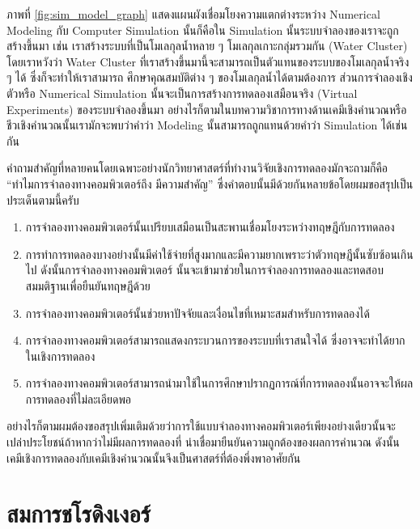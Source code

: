 ภาพที่ \ref{fig:sim_model_graph} แสดงแผนผังเชื่อมโยงความแตกต่างระหว่าง Numerical Modeling กับ Computer Simulation
นั้นก็คือใน Simulation นั้นระบบจำลองของเราจะถูกสร้างขึ้นมา เช่น เราสร้างระบบที่เป็นโมเลกุลน้ำหลาย ๆ โมเลกุลเกาะกลุ่มรวมกัน (Water
Cluster) โดยเราหวังว่า Water Cluster ที่เราสร้างขึ้นมานี้จะสามารถเป็นตัวแทนของระบบของโมเลกุลน้ำจริง ๆ ได้ ซึ่งก็จะทำให้เราสามารถ%
ศึกษาคุณสมบัติต่าง ๆ ของโมเลกุลน้ำได้ตามต้องการ ส่วนการจำลองเชิงตัวหรือ Numerical Simulation นั้นจะเป็นการสร้างการทดลองเสมือนจริง
(Virtual Experiments) ของระบบจำลองขึ้นมา อย่างไรก็ตามในบทความวิชาการทางด้านเคมีเชิงคำนวณหรือชีวเชิงคำนวณนั้นเรามักจะพบว่าคำว่า
Modeling นั้นสามารถถูกแทนด้วยคำว่า Simulation ได้เช่นกัน

คำถามสำคัญที่หลายคนโดยเฉพาะอย่างนักวิทยาศาสตร์ที่ทำงานวิจัยเชิงการทดลองมักจะถามก็คือ \enquote{ทำไมการจำลองทางคอมพิวเตอร์ถึง%
    มีความสำคัญ} ซึ่งคำตอบนั้นมีด้วยกันหลายข้อโดยผมขอสรุปเป็นประเด็นตามนี้ครับ

\begin{enumerate}
    \item การจำลองทางคอมพิวเตอร์นั้นเปรียบเสมือนเป็นสะพานเชื่อมโยงระหว่างทฤษฎีกับการทดลอง

    \item การทำการทดลองบางอย่างนั้นมีค่าใช้จ่ายที่สูงมากและมีความยากเพราะว่าตัวทฤษฎีนั้นซับซ้อนเกินไป ดังนั้นการจำลองทางคอมพิวเตอร์%
          นั้นจะเข้ามาช่วยในการจำลองการทดลองและทดสอบสมมติฐานเพื่อยืนยันทฤษฎีด้วย

    \item การจำลองทางคอมพิวเตอร์นั้นช่วยหาปัจจัยและเงื่อนไขที่เหมาะสมสำหรับการทดลองได้

    \item การจำลองทางคอมพิวเตอร์สามารถแสดงกระบวนการของระบบที่เราสนใจได้ ซึ่งอาจจะทำได้ยากในเชิงการทดลอง

    \item การจำลองทางคอมพิวเตอร์สามารถนำมาใช้ในการศึกษาปรากฏการณ์ที่การทดลองนั้นอาจจะให้ผลการทดลองที่ไม่ละเอียดพอ
\end{enumerate}

อย่างไรก็ตามผมต้องขอสรุปเพิ่มเติมด้วยว่าการใช้แบบจำลองทางคอมพิวเตอร์เพียงอย่างเดียวนั้นจะเปล่าประโยชน์ถ้าหากว่าไม่มีผลการทดลองที่%
น่าเชื่อมายืนยันความถูกต้องของผลการคำนวณ ดังนั้นเคมีเชิงการทดลองกับเคมีเชิงคำนวณนั้นจึงเป็นศาสตร์ที่ต้องพึ่งพาอาศัยกัน

\section{สมการชโรดิงเงอร์}

